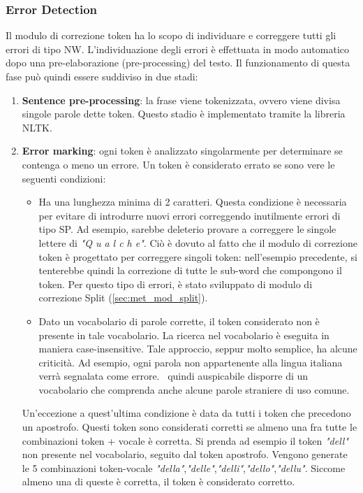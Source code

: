 \subsubsection{Error Detection}
\label{sec:met_tok_errdet}
Il modulo di correzione token ha lo scopo di individuare e correggere tutti gli errori di tipo NW.  L'individuazione degli errori è effettuata in modo automatico dopo
una pre-elaborazione (pre-processing) del testo. Il funzionamento di questa
fase può quindi essere suddiviso in due stadi:
\begin{enumerate}
\item \textbf{Sentence pre-processing}: la frase viene tokenizzata, ovvero viene divisa singole parole dette token. Questo stadio è implementato tramite la libreria NLTK\cite{nltk}.
\item \textbf{Error marking}: ogni token è analizzato singolarmente per determinare se contenga o meno un errore. Un token è considerato errato se sono vere le seguenti condizioni:
	\begin{itemize}
	\item Ha una lunghezza minima di 2 caratteri. Questa condizione è necessaria per evitare di introdurre nuovi errori correggendo inutilmente errori di tipo SP. Ad esempio, sarebbe deleterio provare a correggere le singole lettere di \textit{"Q u a l c h e"}. Ciò è dovuto al fatto che il modulo di correzione token è progettato per correggere singoli token: nell'esempio precedente, si tenterebbe quindi la correzione di tutte le sub-word che compongono il token. Per questo tipo di errori, è stato sviluppato di modulo di correzione Split (\autoref{sec:met_mod_split}).
	
	\item Dato un vocabolario di parole corrette, il token considerato non è presente in tale vocabolario. La ricerca nel vocabolario è eseguita in maniera case-insensitive. Tale approccio, seppur molto semplice, ha alcune criticità. Ad esempio, ogni parola non appartenente alla lingua italiana verrà segnalata come errore. \E\ quindi auspicabile disporre di un vocabolario che comprenda anche alcune parole straniere di uso comune.
	\end{itemize}
Un'eccezione a quest'ultima condizione è data da tutti i token che precedono un apostrofo. Questi token sono considerati corretti se almeno una fra tutte le combinazioni token + vocale è corretta. Si prenda ad esempio il token \textit{"dell"} non presente nel vocabolario, seguito dal token apostrofo. Vengono generate le 5 combinazioni token-vocale \textit{"della"},\textit{"delle"},\textit{"delli"},\textit{"dello"},\textit{"dellu"}. Siccome almeno una di queste è corretta, il token è considerato corretto.
\end{enumerate}

